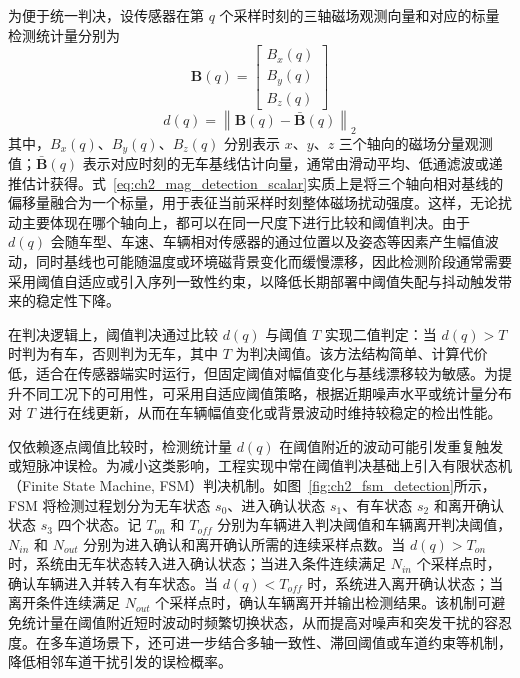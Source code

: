 \documentclass{xdupgthesis}
\begin{document}
为便于统一判决，设传感器在第 $q$ 个采样时刻的三轴磁场观测向量和对应的标量检测统计量分别为
\begin{equation}
	\mathbf{B}(q)=
	\begin{bmatrix}
		B_x(q)\\
		B_y(q)\\
		B_z(q)
	\end{bmatrix}
	\label{eq:ch2_mag_observation_vector}
\end{equation}
\begin{equation}
	d(q)=\left\lVert \mathbf{B}(q)-\bar{\mathbf{B}}(q)\right\rVert_2
	\label{eq:ch2_mag_detection_scalar}
\end{equation}
其中，$B_x(q)$、$B_y(q)$、$B_z(q)$ 分别表示 $x$、$y$、$z$ 三个轴向的磁场分量观测值；$\bar{\mathbf{B}}(q)$ 表示对应时刻的无车基线估计向量，通常由滑动平均、低通滤波或递推估计获得。式~\eqref{eq:ch2_mag_detection_scalar}实质上是将三个轴向相对基线的偏移量融合为一个标量，用于表征当前采样时刻整体磁场扰动强度。这样，无论扰动主要体现在哪个轴向上，都可以在同一尺度下进行比较和阈值判决。由于 $d(q)$ 会随车型、车速、车辆相对传感器的通过位置以及姿态等因素产生幅值波动，同时基线也可能随温度或环境磁背景变化而缓慢漂移，因此检测阶段通常需要采用阈值自适应或引入序列一致性约束，以降低长期部署中阈值失配与抖动触发带来的稳定性下降\cite{sarcevic2022singlemagnetometer}。

在判决逻辑上，阈值判决通过比较 $d(q)$ 与阈值 $T$ 实现二值判定：当 $d(q)>T$ 时判为有车，否则判为无车，其中 $T$ 为判决阈值。该方法结构简单、计算代价低，适合在传感器端实时运行，但固定阈值对幅值变化与基线漂移较为敏感。为提升不同工况下的可用性，可采用自适应阈值策略，根据近期噪声水平或统计量分布对 $T$ 进行在线更新，从而在车辆幅值变化或背景波动时维持较稳定的检出性能。

仅依赖逐点阈值比较时，检测统计量 \(d(q)\) 在阈值附近的波动可能引发重复触发或短脉冲误检。为减小这类影响，工程实现中常在阈值判决基础上引入有限状态机（Finite State Machine, FSM）判决机制。如图~\ref{fig:ch2_fsm_detection}所示，FSM 将检测过程划分为无车状态 \(s_0\)、进入确认状态 \(s_1\)、有车状态 \(s_2\) 和离开确认状态 \(s_3\) 四个状态。记 \(T_{on}\) 和 \(T_{off}\) 分别为车辆进入判决阈值和车辆离开判决阈值，\(N_{in}\) 和 \(N_{out}\) 分别为进入确认和离开确认所需的连续采样点数。当 \(d(q)>T_{on}\) 时，系统由无车状态转入进入确认状态；当进入条件连续满足 \(N_{in}\) 个采样点时，确认车辆进入并转入有车状态。当 \(d(q)<T_{off}\) 时，系统进入离开确认状态；当离开条件连续满足 \(N_{out}\) 个采样点时，确认车辆离开并输出检测结果。该机制可避免统计量在阈值附近短时波动时频繁切换状态，从而提高对噪声和突发干扰的容忍度。在多车道场景下，还可进一步结合多轴一致性、滞回阈值或车道约束等机制，降低相邻车道干扰引发的误检概率\cite{guilbert2016statemachine}。
\end{document}
